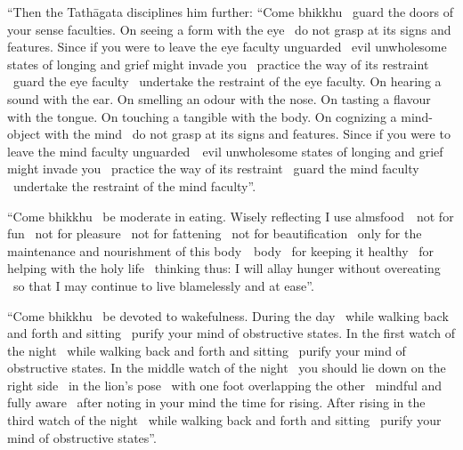 \suttaRef{[MN 51]}

\begin{english-only-justify}
  ``Then the Tathāgata disciplines him further: ``Come bhikkhu \breathmark\ guard the doors of your sense faculties. On seeing a form with the eye \breathmark\ do not grasp at its signs and features. Since if you were to leave the eye faculty unguarded \breathmark\ evil unwholesome states of longing and grief might invade you \breathmark\ practice the way of its restraint \breathmark\ guard the eye faculty \breathmark\ undertake the restraint of the eye faculty. On hearing a sound with the ear. On smelling an odour with the nose. On tasting a flavour with the tongue. On touching a tangible with the body. On cognizing a mind-object with the mind \breathmark\ do not grasp at its signs and features. Since if you were to leave the mind faculty \mbox{unguarded}~\breathmark\ evil unwholesome states of longing and grief might invade you \breathmark\ practice the way of its restraint \breathmark\ guard the mind faculty \breathmark\ undertake the restraint of the mind faculty''.
\end{english-only-justify}

\begin{english-only-justify}
  ``Come bhikkhu \breathmark\ be moderate in eating. Wisely reflecting I use \mbox{almsfood}~\breathmark\ not for fun \breathmark\ not for pleasure \breathmark\ not for fattening \breathmark\ not for beautification \breathmark\ only for the maintenance and nourishment of this \ifbfiveversion \mbox{body}~\breathmark\ \else body \breathmark\ \fi for keeping it healthy \breathmark\ for helping with the holy life \breathmark\ thinking thus: I will allay hunger without overeating \breathmark\ so that I may continue to live blamelessly and at ease''.
\end{english-only-justify}

\begin{english-only-justify}
  ``Come bhikkhu \breathmark\ be devoted to wakefulness. During the day \breathmark\ while walking back and forth and sitting \breathmark\ purify your mind of obstructive states. In the first watch of the night \breathmark\ while walking back and forth and sitting \breathmark\ purify your mind of obstructive states. In the middle watch of the night \breathmark\ you should lie down on the right side \breathmark\ in the lion's pose \breathmark\ with one foot overlapping the other \breathmark\ mindful and fully aware \breathmark\ after noting in your mind the time for rising. After rising in the third watch of the night \breathmark\ while walking back and forth and sitting \breathmark\ purify your mind of obstructive states''.
\end{english-only-justify}

